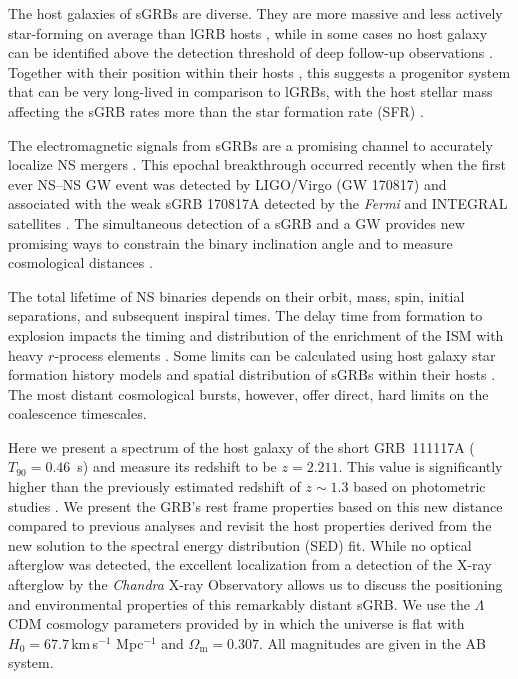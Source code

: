 \documentclass[longauth]{aa}    %
\begin{document}
The host galaxies of sGRBs are diverse. They are more massive and less actively
 star-forming on average than lGRB hosts \citep{Fong2013b}, while in some cases
no host galaxy can be identified above the detection threshold of deep follow-up
observations \citep{Berger2010a, Tunnicliffe2014}. Together with their position
within their hosts \citep{Fong2013a}, this suggests a progenitor system that can
be very long-lived in comparison to lGRBs, with the host stellar mass affecting
the sGRB rates more than the star formation rate (SFR) \citep{Berger2014}.

The electromagnetic signals from sGRBs are a promising channel to accurately
localize NS mergers \citep{Ghirlanda2016}. This epochal breakthrough occurred
recently when the first ever NS--NS GW event  was detected by LIGO/Virgo (GW
170817) and associated with the weak sGRB 170817A detected by the \textit{Fermi}
and INTEGRAL satellites \citep{LIGOScientificCollaboration2017a, Goldstein2017,
        Savchenko2017}. The simultaneous detection of a sGRB and a GW provides new
promising ways to constrain the binary inclination angle \citep{Arun2014,
        LIGOScientificCollaboration2017a} and to measure cosmological distances
\citep{Nissanke2010, LIGOScientificCollaboration2017c}.

The total lifetime of NS binaries depends on their orbit, mass, spin, initial
separations, and subsequent inspiral times. The delay time from formation to
explosion impacts the timing and distribution of the enrichment of the ISM with
heavy $r$-process elements \citep{VandeVoort2015, Wallner2015,  Ji2016}. Some
limits can be calculated using host galaxy star formation history models and
spatial distribution of sGRBs within their hosts \citep[][]{Berger2014}. The
most distant cosmological bursts, however, offer direct, hard limits on the
coalescence timescales.

Here we  present a spectrum of the host galaxy of the short GRB~111117A
($T_{90}=0.46$~s) and measure its redshift to be $z=2.211$. This value is
significantly higher than the previously estimated redshift of $z \sim 1.3$ based on photometric
studies \citep{Margutti2012,Sakamoto2013}. We present the GRB's rest frame
properties based on this new distance compared to previous analyses and revisit
the host properties derived from the new solution to the spectral energy
distribution (SED) fit. While no optical afterglow was detected, the excellent
localization from a detection of the X-ray afterglow by the \emph{Chandra} X-ray
Observatory allows us to discuss the positioning and environmental properties of
this remarkably distant sGRB. We use the $\Lambda$CDM cosmology parameters
provided by \citet{Planck2015} in which the universe is flat with $H_0 =
67.7$\,km\,s$^{-1}$ Mpc$^{-1}$ and $\Omega_\mathrm{m} = 0.307$. All magnitudes
are given in the AB system.
\end{document}

